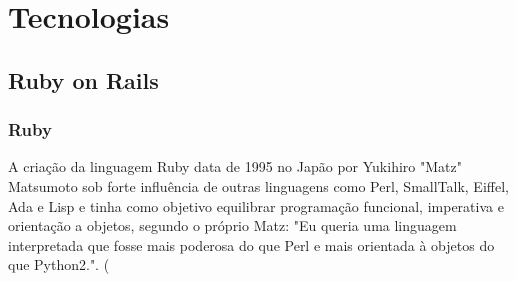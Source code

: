 \chapter{Tecnologias}
\label{cap:tecnologias}
\section{Ruby on Rails}
\subsection{Ruby}
    \par A criação da linguagem Ruby data de 1995 no Japão por Yukihiro "Matz" Matsumoto sob forte influência de outras linguagens como Perl, SmallTalk, Eiffel, Ada e Lisp e tinha como objetivo equilibrar programação funcional, imperativa e orientação a objetos, segundo o próprio Matz: "Eu queria uma linguagem interpretada que fosse mais poderosa do que Perl e mais orientada à objetos do que Python2.". (\cite{rubydocs}
